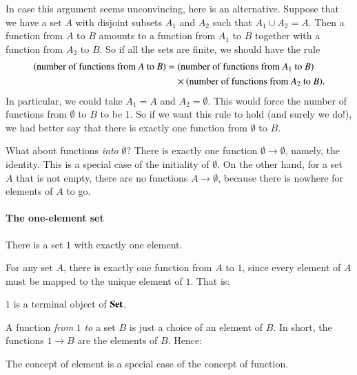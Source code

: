 In case this argument seems unconvincing, here is an alternative.  Suppose
that we have a set $A$ with disjoint subsets $A_1$ and $A_2$ such that $A_1
\cup A_2 = A$.  Then a function from $A$ to $B$ amounts to a function from
$A_1$ to $B$ together with a function from $A_2$ to $B$.  So if all the
sets are finite, we should have the rule
%
\begin{align*}
\label{p:num-fns}
%
\index{function!number of functions}
%
(\text{number of functions from $A$ to $B$})	&
=
(\text{number of functions from $A_1$ to $B$})	\\
& \quad\times
(\text{number of functions from $A_2$ to $B$}).
\end{align*}
%
In particular, we could take $A_1 = A$ and $A_2 = \emptyset$.  This would
force the number of functions from $\emptyset$ to $B$ to be $1$.  So if we
want this rule to hold (and surely we do!), we had better say that there is
exactly one function from $\emptyset$ to $B$.

What about functions \emph{into} $\emptyset$?  There is exactly one function
$\emptyset \to \emptyset$, namely, the identity.  This is a special case of
the initiality of $\emptyset$.  On the other hand, for a set $A$ that is not
empty, there are no functions $A \to \emptyset$, because there is nowhere for
elements of $A$ to go.


\paragraph*{The one-element set}
%
%
There is a set $1$ with exactly one element.

For any set $A$, there is exactly one function from $A$ to $1$, since every
element of $A$ must be mapped to the unique element of $1$.  That is:
%
\begin{setprop}
$1$ is a terminal object of \hspace{.1em}$\mathbf{Set}$.
\end{setprop}

A function \emph{from} $1$ \emph{to} a set $B$ is just a choice of an element
of $B$.  In short, the functions $1 \to B$ are the elements of $B$.  Hence:
%
\begin{slogan}
The concept of element is a special case of the concept of function.%
%
%
\end{slogan}

